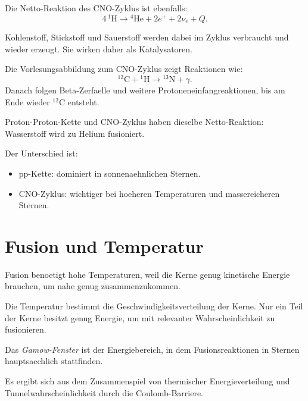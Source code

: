 \begin{conceptbox}
Die Netto-Reaktion des CNO-Zyklus ist ebenfalls:
\[
    4\,{}^{1}\mathrm{H}
    \rightarrow
    {}^{4}\mathrm{He}
    + 2e^+
    + 2\nu_e
    + Q.
\]

Kohlenstoff, Stickstoff und Sauerstoff werden dabei im Zyklus verbraucht und wieder
erzeugt.
Sie wirken daher als Katalysatoren.
\end{conceptbox}

\begin{notebox}
Die Vorlesungsabbildung zum CNO-Zyklus zeigt Reaktionen wie:
\[
    {}^{12}\mathrm{C}
    +
    {}^{1}\mathrm{H}
    \rightarrow
    {}^{13}\mathrm{N}
    +
    \gamma.
\]
Danach folgen Beta-Zerfaelle und weitere Protoneneinfangreaktionen, bis am Ende
wieder ${}^{12}\mathrm{C}$ entsteht.
\end{notebox}

\begin{examtipbox}
Proton-Proton-Kette und CNO-Zyklus haben dieselbe Netto-Reaktion:
Wasserstoff wird zu Helium fusioniert.

Der Unterschied ist:
\begin{itemize}
    \item pp-Kette: dominiert in sonnenaehnlichen Sternen.
    \item CNO-Zyklus: wichtiger bei hoeheren Temperaturen und massereicheren Sternen.
\end{itemize}
\end{examtipbox}

\section{Fusion und Temperatur}

\begin{conceptbox}
Fusion benoetigt hohe Temperaturen, weil die Kerne genug kinetische Energie brauchen,
um nahe genug zusammenzukommen.

Die Temperatur bestimmt die Geschwindigkeitsverteilung der Kerne.
Nur ein Teil der Kerne besitzt genug Energie, um mit relevanter Wahrscheinlichkeit
zu fusionieren.
\end{conceptbox}

\begin{definitionbox}
Das \emph{Gamow-Fenster} ist der Energiebereich, in dem Fusionsreaktionen in Sternen
hauptsaechlich stattfinden.

Es ergibt sich aus dem Zusammenspiel von thermischer Energieverteilung und
Tunnelwahrscheinlichkeit durch die Coulomb-Barriere.
\end{definitionbox}

